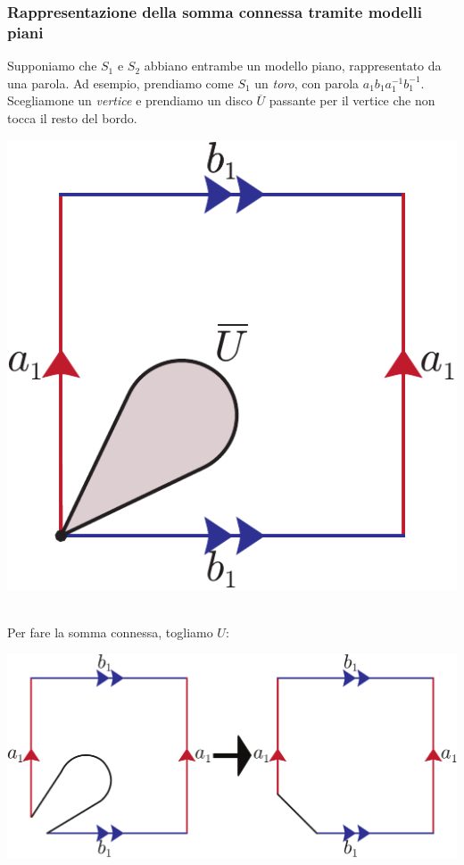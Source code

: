 \subsubsection{Rappresentazione della somma connessa tramite modelli piani}
\begin{minipage}{.74\linewidth}
Supponiamo che $S_1$ e $S_2$ abbiano entrambe un modello piano, rappresentato da una parola. Ad esempio, prendiamo come $S_1$ un \textit{toro}, con parola $a_1b_1a_1^{-1}b_1^{-1}$. Scegliamone un \textit{vertice} e prendiamo un disco $\overline{U}$ passante per il vertice che non tocca il resto del bordo.
\end{minipage}
\begin{minipage}{.25\linewidth}
\begin{center}
	\includegraphics[trim=0cm 0cm 0cm 0cm, clip, scale=0.4]{images/torusmodelconnect1.pdf}
\end{center}
\end{minipage}~{}\\
Per fare la somma connessa, togliamo $U$:
\begin{center}
	\includegraphics[trim=0cm 0cm 0cm 0cm, clip, scale=0.35]{images/torusmodelconnect2.pdf}
\end{center}
